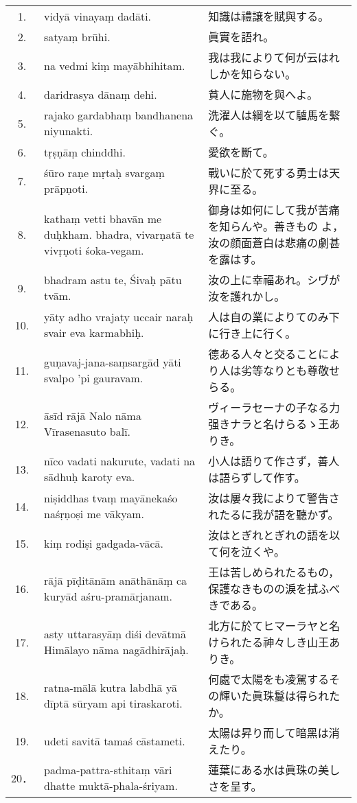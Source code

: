 \begin{longtable}{c*{2}{p{0.45\hsize}}}
 1. & vidyā vinayaṃ dadāti. & 知識は禮譲を賦與する。 \\
 2. & satyaṃ brūhi. & 眞實を語れ。\\
 3. & na vedmi kiṃ mayābhihitam. & 我は我によりて何が云はれしかを知らない。\\
 4. & daridrasya dānaṃ dehi. & 貧人に施物を與へよ。\\
 5. & rajako gardabhaṃ bandhane\-na niyunakti. & 洗濯人は綱を以て驢馬を繫ぐ。\\
 6. & tṛṣṇāṃ chinddhi. & 愛欲を斷て。\\
 7. & śūro raṇe mṛtaḥ svargaṃ prāpṇoti. & 戰いに於て死する勇士は天界に至る。\\
 8. & kathaṃ vetti bhavān me duḥkham. bhadra, vivarṇatā te
 vivṛṇoti śoka-vegam. & 御身は如何にして我が苦痛を知らんや。善きもの
 よ，汝の顔面蒼白は悲痛の劇甚を露はす。\\
 9. & bhadram astu te, Śivaḥ pātu tvām. & 汝の上に幸福あれ。シヷが汝を護れかし。\\
10. & yāty adho vrajaty uccair naraḥ svair eva karmabhiḥ. & 人は自の業によりてのみ下
 に行き上に行く。\\
11. & guṇavaj-jana-saṃsargād yāti svalpo 'pi gauravam. & 德ある人々と交ることによ
 り人は劣等なりとも尊敬せらる。\\
12. & āsīd rājā Nalo nāma Vīrasena\-suto balī. & ヴィーラセーナの子なる力
 强きナラと名けらるゝ王ありき。\\
13. & nīco vadati nakurute, vadati na sādhuḥ karoty eva. & 小人は語りて作さず，善人
 は語らずして作す。\\
14. & niṣiddhas tvaṃ mayānekaśo naśṛṇoṣi me vākyam. & 汝は屢々我によりて警吿さ
 れたるに我が語を聽かず。\\
15. & kiṃ rodiṣi gadgada-vācā. & 汝はとぎれとぎれの語を以て何を泣くや。\\
16. & rājā pīḍitānām anāthānāṃ ca kuryād aśru-pramārjanam. & 王は苦しめられたるもの，
 保護なきものの淚を拭ふべきである。\\
17. & asty uttarasyāṃ diśi devātmā Himālayo nāma nagādhirājaḥ. & 北方に於てヒマーラヤと名
 けられたる神々しき山王ありき。\\
18. & ratna-mālā kutra labdhā yā dīptā sūryam api tiraskaroti.& 何處で太陽をも凌駕するそ
 の輝いた眞珠鬘は得られたか。\\
19. & udeti savitā tamaś cāstameti. & 太陽は昇り而して暗黑は消えたり。\\
20．& padma-pattra-sthitaṃ vāri dhatte muktā-phala-śriyam. & 蓮葉にある水は眞珠の美しさを呈す。\\

\end{longtable}
